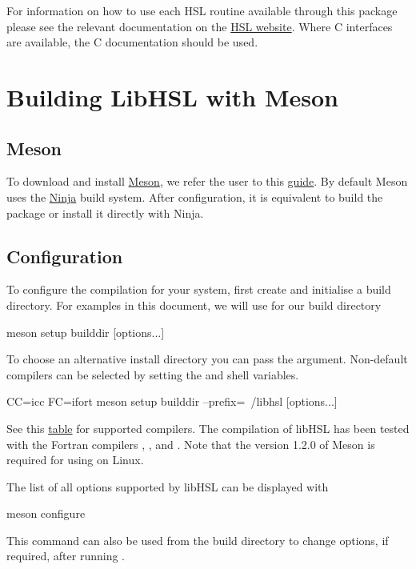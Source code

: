 \documentclass[gdweb]{geradwp}
\renewcommand{\_}{\raisebox{+0.35mm}{\textunderscore}}
\newcommand{\LibHSL}{LibHSL\xspace}
\begin{document}
For information on how to use each HSL routine available through this package
please see the relevant documentation on the \href{https://www.hsl.rl.ac.uk/catalogue/}{HSL website}.
Where C interfaces are available, the C documentation should be used.

\section{Building \LibHSL with Meson}

\subsection{Meson}

To download and install \href{https://mesonbuild.com}{Meson}, we refer the user to this \href{https://mesonbuild.com/SimpleStart.html}{guide}.
By default Meson uses the \href{https://ninja-build.org/}{Ninja} build system.
After configuration, it is equivalent to build the package or install it directly with Ninja.

\subsection{Configuration}

To configure the compilation for your system, first create and initialise a build directory.
For examples in this document, we will use  for our build directory

\begin{jllisting}
meson setup builddir [options...]
\end{jllisting}
To choose an alternative install directory you can pass the  argument.
Non-default compilers can be selected by setting the  and  shell variables.

\begin{jllisting}
CC=icc FC=ifort meson setup builddir --prefix=~/libhsl [options...]
\end{jllisting}
See this \href{https://mesonbuild.com/Reference-tables.html}{table} for supported compilers.
The compilation of libHSL has been tested with the Fortran compilers
, ,  and .
Note that the version 1.2.0 of Meson is required for using  on Linux.

The list of all options supported by libHSL can be displayed with

\begin{jllisting}
meson configure
\end{jllisting}
This command can also be used from the build directory to change options,
if required, after running .
\end{document}
